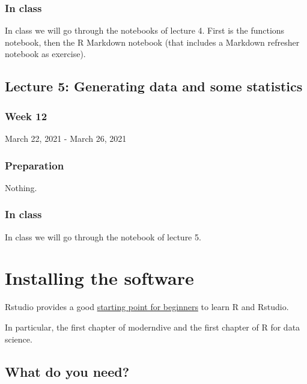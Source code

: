 \documentclass[
]{book}
\begin{document}
\hypertarget{in-class-3}{%
\subsection{In class}\label{in-class-3}}

In class we will go through the notebooks of lecture 4.
First is the functions notebook, then the R Markdown notebook (that includes a Markdown refresher notebook as exercise).

\hypertarget{lecture-5-generating-data-and-some-statistics}{%
\section{Lecture 5: Generating data and some statistics}\label{lecture-5-generating-data-and-some-statistics}}

\hypertarget{week-12}{%
\subsection{Week 12}\label{week-12}}

March 22, 2021 - March 26, 2021

\hypertarget{preparation-4}{%
\subsection{Preparation}\label{preparation-4}}

Nothing.

\hypertarget{in-class-4}{%
\subsection{In class}\label{in-class-4}}

In class we will go through the notebook of lecture 5.

\hypertarget{installing-the-software}{%
\chapter{Installing the software}\label{installing-the-software}}

Rstudio provides a good \href{https://education.rstudio.com/learn/beginner/}{starting point for beginners} to learn R and Rstudio.

In particular, the first chapter of moderndive and the first chapter of R for data science.

\hypertarget{what-do-you-need}{%
\section{What do you need?}\label{what-do-you-need}}
\end{document}
